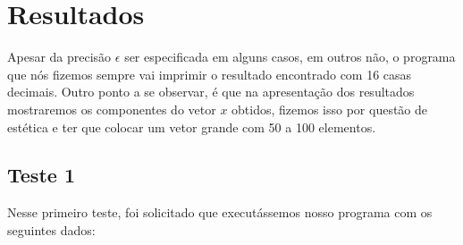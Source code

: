 \chapter{Resultados}
Apesar da precisão \(\epsilon\) ser especificada em alguns casos, em outros
não, o programa que nós fizemos sempre vai imprimir o resultado encontrado
com 16 casas decimais. Outro ponto a se observar, é que na apresentação dos
resultados mostraremos os componentes do vetor \(x\) obtidos, fizemos isso
por questão de estética e ter que colocar um vetor grande com 50 a 100
elementos.

\section{Teste 1}
Nesse primeiro teste, foi solicitado que executássemos nosso programa com os seguintes dados:

